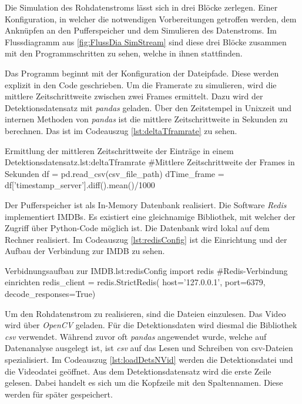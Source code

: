 Die Simulation des Rohdatenstroms lässt sich in drei Blöcke zerlegen. Einer Konfiguration, in welcher die notwendigen Vorbereitungen getroffen werden, dem Anknüpfen an den Pufferspeicher und dem Simulieren des Datenstroms. Im Flussdiagramm aus \autoref{fig:FlussDia SimStream} sind diese drei Blöcke zusammen mit den Programmschritten zu sehen, welche in ihnen stattfinden. \par


Das Programm beginnt mit der Konfiguration der Dateipfade. Diese werden explizit in den Code geschrieben. Um die Framerate zu simulieren, wird die mittlere Zeitschrittweite zwischen zwei Frames ermittelt. Dazu wird der Detektionsdatensatz mit \textit{pandas} geladen. Über den Zeitstempel in Unixzeit und internen Methoden von \textit{pandas} ist die mittlere Zeitschrittweite in Sekunden zu berechnen. Das ist im Codeauszug \ref{lst:deltaTframrate} zu sehen.

\begin{pythoncode}{Ermittlung der mittleren Zeitschrittweite der Einträge in einem Detektionsdatensatz.}{lst:deltaTframrate}
#Mittlere Zeitschrittweite der Frames in Sekunden 
df = pd.read_csv(csv_file_path)
dTime_frame = df['timestamp_server'].diff().mean()/1000
\end{pythoncode}

Der Pufferspeicher ist als In-Memory Datenbank realisiert. Die Software \textit{Redis} implementiert IMDBs. Es existiert eine gleichnamige Bibliothek, mit welcher der Zugriff über Python-Code möglich ist. Die Datenbank wird lokal auf dem Rechner realisiert. Im Codeauszug \ref{lst:redisConfig} ist die Einrichtung und der Aufbau der Verbindung zur IMDB zu sehen.

\begin{pythoncode}{Verbidnungsaufbau zur IMDB.}{lst:redisConfig}
import redis
#Redis-Verbindung einrichten
redis_client = redis.StrictRedis(
                    host='127.0.0.1',
                    port=6379,
                    decode_responses=True)
\end{pythoncode}

Um den Rohdatenstrom zu realisieren, sind die Dateien einzulesen. Das Video wird über \textit{OpenCV} geladen. Für die Detektionsdaten wird diesmal die Bibliothek \textit{csv} verwendet. Während zuvor oft \textit{pandas} angewendet wurde, welche auf Datenanalyse ausgelegt ist, ist \textit{csv} auf das Lesen und Schreiben von csv-Dateien spezialisiert. Im Codeauszug \ref{lst:loadDetsNVid} werden die Detektionsdatei und die Videodatei geöffnet. Aus dem Detektionsdatensatz wird die erste Zeile gelesen. Dabei handelt es sich um die Kopfzeile mit den Spaltennamen. Diese werden für später gespeichert. 


